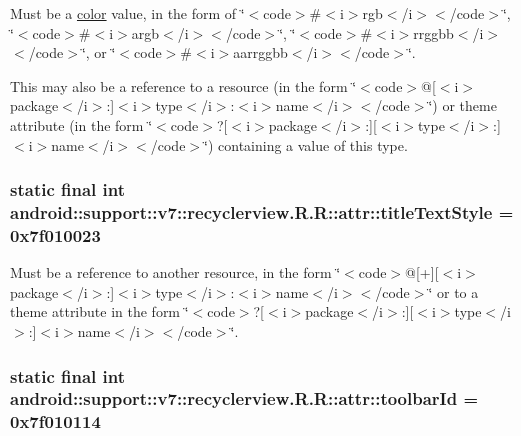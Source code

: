 Must be a \hyperlink{classandroid_1_1support_1_1v7_1_1recyclerview_1_1_r_1_1color}{color} value, in the form of \char`\"{}$<$code$>$\#$<$i$>$rgb$<$/i$>$$<$/code$>$\char`\"{}, \char`\"{}$<$code$>$\#$<$i$>$argb$<$/i$>$$<$/code$>$\char`\"{}, \char`\"{}$<$code$>$\#$<$i$>$rrggbb$<$/i$>$$<$/code$>$\char`\"{}, or \char`\"{}$<$code$>$\#$<$i$>$aarrggbb$<$/i$>$$<$/code$>$\char`\"{}. 

This may also be a reference to a resource (in the form \char`\"{}$<$code$>$@\mbox{[}$<$i$>$package$<$/i$>$:\mbox{]}$<$i$>$type$<$/i$>$:$<$i$>$name$<$/i$>$$<$/code$>$\char`\"{}) or theme attribute (in the form \char`\"{}$<$code$>$?\mbox{[}$<$i$>$package$<$/i$>$:\mbox{]}\mbox{[}$<$i$>$type$<$/i$>$:\mbox{]}$<$i$>$name$<$/i$>$$<$/code$>$\char`\"{}) containing a value of this type. \hypertarget{classandroid_1_1support_1_1v7_1_1recyclerview_1_1_r_1_1attr_a0cd46feb044c30ec1747d972dd074c2}{
\subsubsection[{titleTextStyle}]{\setlength{\rightskip}{0pt plus 5cm}static final int android::support::v7::recyclerview.R.R::attr::titleTextStyle = 0x7f010023}}
\label{classandroid_1_1support_1_1v7_1_1recyclerview_1_1_r_1_1attr_a0cd46feb044c30ec1747d972dd074c2}


Must be a reference to another resource, in the form \char`\"{}$<$code$>$@\mbox{[}+\mbox{]}\mbox{[}$<$i$>$package$<$/i$>$:\mbox{]}$<$i$>$type$<$/i$>$:$<$i$>$name$<$/i$>$$<$/code$>$\char`\"{} or to a theme attribute in the form \char`\"{}$<$code$>$?\mbox{[}$<$i$>$package$<$/i$>$:\mbox{]}\mbox{[}$<$i$>$type$<$/i$>$:\mbox{]}$<$i$>$name$<$/i$>$$<$/code$>$\char`\"{}. \hypertarget{classandroid_1_1support_1_1v7_1_1recyclerview_1_1_r_1_1attr_8b401a71bfe72fe32a2cf13ab1d5e7d6}{
\subsubsection[{toolbarId}]{\setlength{\rightskip}{0pt plus 5cm}static final int android::support::v7::recyclerview.R.R::attr::toolbarId = 0x7f010114}}
\label{classandroid_1_1support_1_1v7_1_1recyclerview_1_1_r_1_1attr_8b401a71bfe72fe32a2cf13ab1d5e7d6}


